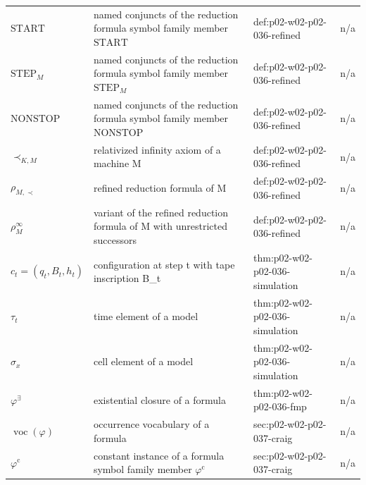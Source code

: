 \begin{longtable}{@{}p{}p{}p{}p{}@{}}
\(\mathrm{START}\) & named conjuncts of the reduction formula symbol family member \(\mathrm{START}\) & def:\allowbreak{}p02-\allowbreak{}w02-\allowbreak{}p02-\allowbreak{}036-\allowbreak{}refined & n/a \\
\(\mathrm{STEP}_M\) & named conjuncts of the reduction formula symbol family member \(\mathrm{STEP}_M\) & def:\allowbreak{}p02-\allowbreak{}w02-\allowbreak{}p02-\allowbreak{}036-\allowbreak{}refined & n/a \\
\(\mathrm{NONSTOP}\) & named conjuncts of the reduction formula symbol family member \(\mathrm{NONSTOP}\) & def:\allowbreak{}p02-\allowbreak{}w02-\allowbreak{}p02-\allowbreak{}036-\allowbreak{}refined & n/a \\
\(\prec_{K,M}\) & relativized infinity axiom of a machine M & def:\allowbreak{}p02-\allowbreak{}w02-\allowbreak{}p02-\allowbreak{}036-\allowbreak{}refined & n/a \\
\(\rho_{M,\prec}\) & refined reduction formula of M & def:\allowbreak{}p02-\allowbreak{}w02-\allowbreak{}p02-\allowbreak{}036-\allowbreak{}refined & n/a \\
\(\rho^{\infty}_M\) & variant of the refined reduction formula of M with unrestricted successors & def:\allowbreak{}p02-\allowbreak{}w02-\allowbreak{}p02-\allowbreak{}036-\allowbreak{}refined & n/a \\
\(c_t=(q_t,\allowbreak B_t,\allowbreak h_t)\) & configuration at step t with tape inscription B\_t & thm:\allowbreak{}p02-\allowbreak{}w02-\allowbreak{}p02-\allowbreak{}036-\allowbreak{}simulation & n/a \\
\(\tau_t\) & time element of a model & thm:\allowbreak{}p02-\allowbreak{}w02-\allowbreak{}p02-\allowbreak{}036-\allowbreak{}simulation & n/a \\
\(\sigma_x\) & cell element of a model & thm:\allowbreak{}p02-\allowbreak{}w02-\allowbreak{}p02-\allowbreak{}036-\allowbreak{}simulation & n/a \\
\(\varphi^{\exists}\) & existential closure of a formula & thm:\allowbreak{}p02-\allowbreak{}w02-\allowbreak{}p02-\allowbreak{}036-\allowbreak{}fmp & n/a \\
\(\operatorname{voc}(\varphi)\) & occurrence vocabulary of a formula & sec:\allowbreak{}p02-\allowbreak{}w02-\allowbreak{}p02-\allowbreak{}037-\allowbreak{}craig & n/a \\
\(\varphi^{\mathrm{c}}\) & constant instance of a formula symbol family member \(\varphi^{\mathrm{c}}\) & sec:\allowbreak{}p02-\allowbreak{}w02-\allowbreak{}p02-\allowbreak{}037-\allowbreak{}craig & n/a \\

\end{longtable}
